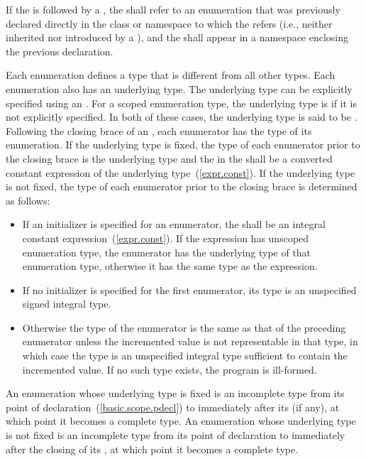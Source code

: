 \pnum
If the  is followed by a
, the  shall
refer to an enumeration that was previously declared directly in the class or
namespace to which the  refers (i.e., neither
inherited nor introduced by a ), and the
 shall appear in a namespace enclosing the previous
declaration.

\pnum
{}%
%
Each enumeration defines a type that is different from all other types.
Each enumeration also has an underlying type.
The underlying type can be explicitly specified using an .
For a scoped enumeration type, the underlying type is  if it is not
explicitly specified. In both of these cases, the underlying type is said to be
.
Following the closing brace of an , each
enumerator has the type of its enumeration.
If the underlying type is fixed, the type of each enumerator
prior to the closing brace is the underlying
type
and the  in the 
shall be a converted constant expression of the underlying
type~(\ref{expr.const}).
If the underlying
type is not fixed,
the type of each enumerator prior to the closing brace is determined as
follows:

\begin{itemize}
\item If an
initializer is specified for an enumerator, the
 shall be an integral constant
expression~(\ref{expr.const}). If the expression has
unscoped enumeration type, the enumerator has the underlying type of that
enumeration type, otherwise it has the same type as the expression.

\item If no initializer is specified for the
first enumerator, its type is an unspecified signed integral type.

\item  Otherwise
the type of the enumerator is the same as that of the
preceding enumerator unless the incremented value is not representable
in that type, in which case the type is an unspecified integral type
sufficient to contain the incremented value. If no such type exists, the program
is ill-formed.
\end{itemize}

\pnum
An enumeration whose underlying type is fixed is an incomplete type from its
point of declaration~(\ref{basic.scope.pdecl}) to immediately after its
 (if any), at which point it becomes a complete type.
An enumeration whose underlying type is not fixed is an incomplete type from
its point of declaration to immediately after the closing \tcode{\}} of its
, at which point it becomes a complete type.

